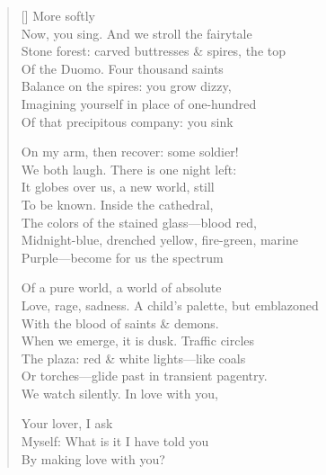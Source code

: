 \label{ch:milano_lover}
\settowidth{\versewidth}{Love, rage, sadness. A child's palette, but emblazoned}
\begin{verse}[\versewidth]
                      More softly\\
Now, you sing.   And we stroll the fairytale\\
Stone forest: carved buttresses \& spires, the top\\
Of the Duomo.    Four thousand saints\\
Balance on the spires: you grow dizzy,\\
Imagining yourself in place of one-hundred\\
Of that precipitous company: you sink

On my arm, then recover: some soldier!\\
We both laugh.   There is one night left:\\
It globes over us, a new world, still\\
To be known.   Inside the cathedral,\\
The colors of the stained glass---blood red,\\
Midnight-blue, drenched yellow, fire-green, marine\\
Purple---become for us the spectrum

Of a pure world, a world of absolute\\
Love, rage, sadness. A child's palette, but emblazoned\\
With the blood of saints \& demons.\\
When we emerge, it is dusk.   Traffic circles\\
The plaza: red \& white lights---like coals\\
Or torches---glide past in transient pagentry.\\
We watch silently.    In love with you,

Your lover, I ask\\
Myself: What is it I have told you\\
By making love with you?
\end{verse}
